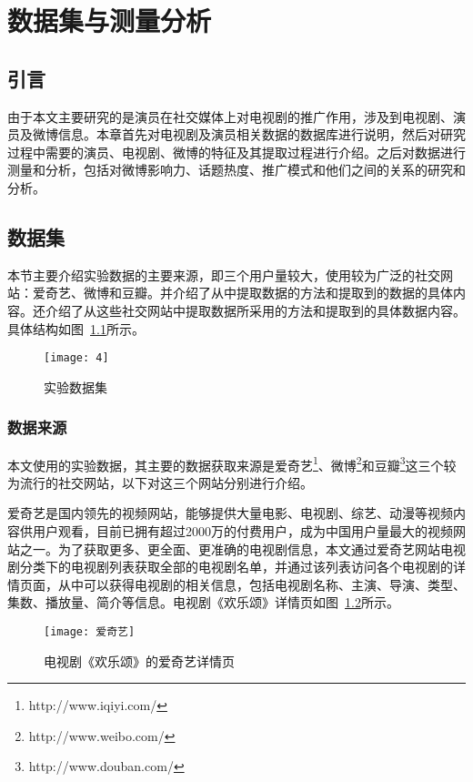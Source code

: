 \chapter{数据集与测量分析}
\label{cha:database and measurement}

\section{引言}
由于本文主要研究的是演员在社交媒体上对电视剧的推广作用，涉及到电视剧、演员及微博信息。本章首先对电视剧及演员相关数据的数据库进行说明，然后对研究过程中需要的演员、电视剧、微博的特征及其提取过程进行介绍。之后对数据进行测量和分析，包括对微博影响力、话题热度、推广模式和他们之间的关系的研究和分析。

\section{数据集}

本节主要介绍实验数据的主要来源，即三个用户量较大，使用较为广泛的社交网站：爱奇艺、微博和豆瓣。并介绍了从中提取数据的方法和提取到的数据的具体内容。还介绍了从这些社交网站中提取数据所采用的方法和提取到的具体数据内容。具体结构如图~\ref{database}所示。

\begin{figure}[h] 
  \centering
  \texttt{[image: 4]}
  \caption{实验数据集}
  \label{database}
\end{figure}

\subsection{数据来源}

本文使用的实验数据，其主要的数据获取来源是爱奇艺\footnote{http://www.iqiyi.com/}、微博\footnote{http://www.weibo.com/}和豆瓣\footnote{http://www.douban.com/}这三个较为流行的社交网站，以下对这三个网站分别进行介绍。

爱奇艺是国内领先的视频网站，能够提供大量电影、电视剧、综艺、动漫等视频内容供用户观看，目前已拥有超过2000万的付费用户，成为中国用户量最大的视频网站之一。为了获取更多、更全面、更准确的电视剧信息，本文通过爱奇艺网站电视剧分类下的电视剧列表获取全部的电视剧名单，并通过该列表访问各个电视剧的详情页面，从中可以获得电视剧的相关信息，包括电视剧名称、主演、导演、类型、集数、播放量、简介等信息。电视剧《欢乐颂》详情页如图~\ref{爱奇艺}所示。

\begin{figure}[h] 
  \centering
  \texttt{[image: 爱奇艺]}
  \caption{电视剧《欢乐颂》的爱奇艺详情页}
  \label{爱奇艺}
\end{figure}

